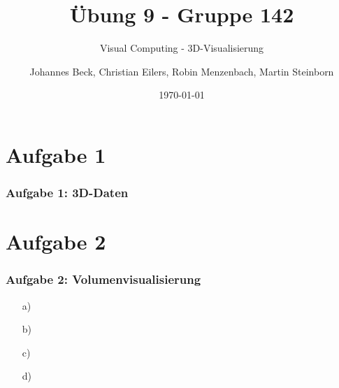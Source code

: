 \documentclass[accentcolor=tud9c,colorbacktitle,inverttitle,landscape,german,presentation,t]{tudbeamer}
\begin{document}
\title{\"Ubung 9 - Gruppe 142}
\subtitle{Visual Computing - 3D-Visualisierung}

\author[Johannes Beck, Christian Eilers, Robin Menzenbach, Martin Steinborn]{Johannes Beck, Christian Eilers, Robin Menzenbach, Martin Steinborn}


\date{\today}

\begin{titleframe}
\end{titleframe}

\section{Aufgabe 1}
	\begin{frame}
		\frametitle{Aufgabe 1: 3D-Daten}
	\end{frame}

\section{Aufgabe 2}
\begin{frame}
	\frametitle{Aufgabe 2: Volumenvisualisierung}
			\begin{itemize}
		\item[a)] %
		\item[b)] %
		\item[c)] %
		\item[d)] %
	\end{itemize}
\end{frame}
\end{document}
